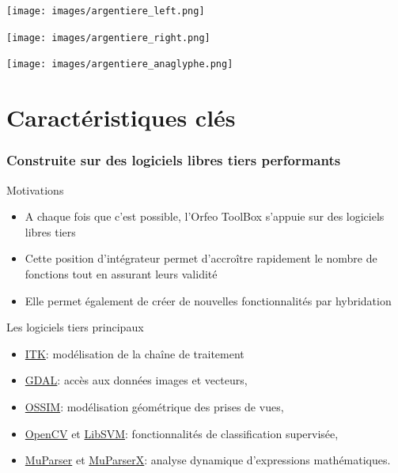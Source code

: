 \documentclass[8pt]{beamer}
\begin{document}
\vspace*{-6.5mm}
\begin{frame}[plain]
\hspace*{-11mm}
    \texttt{[image: images/argentiere\_left.png]}
\end{frame}

\vspace*{-6.5mm}
\begin{frame}[plain]
\hspace*{-11mm}
    \texttt{[image: images/argentiere\_right.png]}
\end{frame}

\vspace*{-6.5mm}
\begin{frame}[plain]
\hspace*{-11mm}
    \texttt{[image: images/argentiere\_anaglyphe.png]}
\end{frame}

\section{Caractéristiques clés}

\begin{frame}
\frametitle{Construite sur des logiciels libres tiers performants}
\begin{block}{Motivations}
\begin{itemize}
\item A chaque fois que c'est possible, l'Orfeo ToolBox s'appuie sur des
  logiciels libres tiers
\item Cette position d'intégrateur permet d'accroître rapidement le nombre de fonctions tout en assurant leurs validité
\item Elle permet également de créer de nouvelles fonctionnalités par hybridation
\end{itemize}
\end{block}

\begin{block}{Les logiciels tiers principaux}
\begin{itemize}
\item \href{www.itk.org}{ITK}: modélisation de la chaîne de traitement
\item \href{www.gdal.org}{GDAL}: accès aux données images et vecteurs,
\item \href{www.ossim.org}{OSSIM}: modélisation géométrique des prises de vues,
\item \href{www.opencv.org}{OpenCV} et \href{www.libsvm.org}{LibSVM}: fonctionnalités de classification supervisée,
\item \href{www.muparser.org}{MuParser} et \href{www.muparserx.org}{MuParserX}:
analyse dynamique d'expressions mathématiques.
\end{itemize}
\end{block}


\end{frame}
\end{document}
